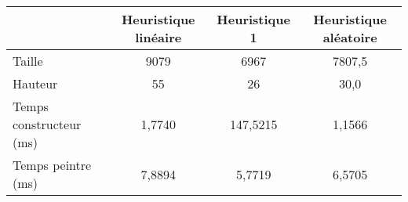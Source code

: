 \begin{center}
{\tabulinesep=1.2mm
\begin{tabu}{|l|c|c|c|}
  \hline
  & Heuristique linéaire  & Heuristique 1 & Heuristique aléatoire \\ 
  \hline
  Taille &      9079&      6967&    7807,5  \\ 
  \hline
  Hauteur &        55&        26&      30,0  \\ 
  \hline
  Temps constructeur (ms) &          1,7740&        147,5215&          1,1566  \\ 
  \hline
  Temps peintre (ms) &            7,8894&           5,7719&           6,5705  \\ 
  \hline
\end{tabu}
}
\end{center}

